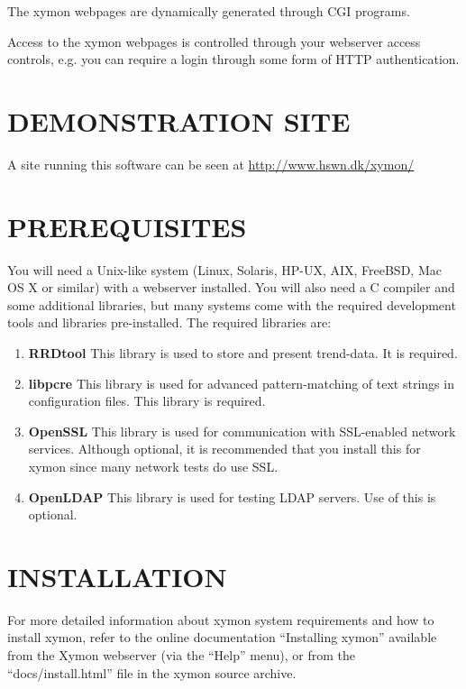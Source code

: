  The xymon webpages are dynamically generated through CGI programs. 


 Access to the xymon webpages is controlled through your webserver
 access controls, e.g. you can require a login through some form of
 HTTP authentication. 

 
\section{DEMONSTRATION SITE}
 A site running this software can be seen at \url{http://www.hswn.dk/xymon/}

 
\section{PREREQUISITES}

 You will need a Unix-like system (Linux, Solaris, HP-UX, AIX,
 FreeBSD, Mac OS X or similar) with a webserver installed. You will
 also need a C compiler and some additional libraries, but many
 systems come with the required development tools and libraries
 pre-installed. The required libraries are: 


\begin{enumerate}

 \item \textbf{RRDtool}
 This library is used to store and present trend-data. It is required. 

 \item \textbf{libpcre}
 This library is used for advanced pattern-matching of text strings in
 configuration files. This library is required. 

 \item \textbf{OpenSSL}
 This library is used for communication with SSL-enabled network
 services. Although optional, it is recommended that you install this
 for xymon since many network tests do use SSL. 

 \item \textbf{OpenLDAP}
 This library is used for testing LDAP servers. Use of this is optional. 

\end{enumerate}

\section{INSTALLATION}
  For more detailed information about xymon system requirements and
  how to install xymon, refer to the online documentation
  ``Installing xymon'' available from the Xymon webserver (via the
  ``Help'' menu), or from the ``docs/install.html'' file in the xymon
  source archive. 


